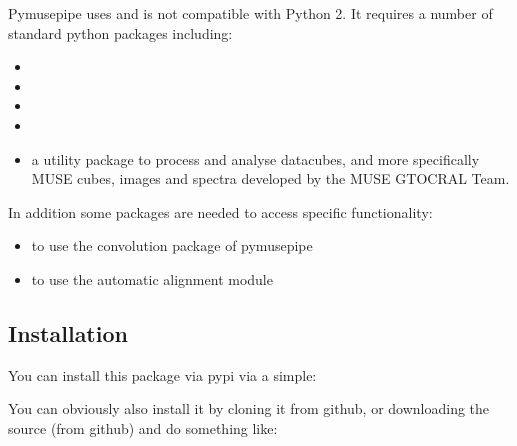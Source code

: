 \documentclass[letterpaper,10pt,english]{sphinxmanual}
\begin{document}
\sphinxAtStartPar
Pymusepipe uses  and is not compatible with Python 2.
It requires a number of standard python packages including:
\begin{itemize}
\item {} 
\sphinxAtStartPar
{}

\item {} 
\sphinxAtStartPar
{}

\item {} 
\sphinxAtStartPar
{}

\item {} 
\sphinxAtStartPar
{}

\item {} 
\sphinxAtStartPar
{} a utility package to process and analyse datacubes, and more specifically
MUSE cubes, images and spectra developed by the MUSE GTO\sphinxhyphen{}CRAL Team.

\end{itemize}

\sphinxAtStartPar
In addition some packages are needed to access specific functionality:
\begin{itemize}
\item {} 
\sphinxAtStartPar
{} to use the convolution package of pymusepipe

\item {} 
\sphinxAtStartPar
{} to use the automatic alignment module

\end{itemize}


\subsection{Installation}
\label{\detokenize{install:installation}}
\sphinxAtStartPar
You can install this package via pypi via a simple:

\begin{sphinxVerbatim}[commandchars=\\\{\}]
  
\end{sphinxVerbatim}

\sphinxAtStartPar
You can obviously also install it by cloning it from github, or
downloading the source (from github) and do something like:

\begin{sphinxVerbatim}[commandchars=\\\{\}]
  
\end{sphinxVerbatim}
\end{document}
